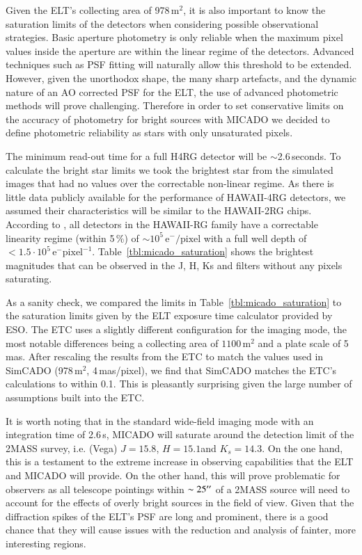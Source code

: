 Given the ELT's collecting area of 978\,m$^2$, it is also important to know the saturation limits of the detectors when considering possible observational strategies. Basic aperture photometry is only reliable when the maximum pixel values inside the aperture are within the linear regime of the detectors. Advanced techniques such as PSF fitting will naturally allow this threshold to be extended. However, given the unorthodox shape, the many sharp artefacts, and the dynamic nature of an AO corrected PSF for the ELT, the use of advanced photometric methods will prove challenging. Therefore in order to set conservative limits on the accuracy of photometry for bright sources with MICADO we decided to define photometric reliability as stars with only unsaturated pixels.

The minimum read-out time for a full H4RG detector will be $\sim$2.6\,seconds.
To calculate the bright star limits we took the brightest star from the simulated images that had no values over the correctable non-linear regime. As there is little data publicly available for the performance of HAWAII-4RG detectors, we assumed their characteristics will be similar to the HAWAII-2RG chips. According to \citet{hawaii2rg}, all detectors in the HAWAII-RG family have a correctable linearity regime (within 5\,\%) of $\sim 10^{5}\,\mathrm{e}^{-}/\mathrm{pixel}$ with a full well depth of $<1.5 \cdot 10^{5}\,\mathrm{e}^{-}\mathrm{pixel}^{-1}$. Table~\ref{tbl:micado_saturation} shows the brightest magnitudes that can be observed in the J, H, Ks and \brgamma filters without any pixels saturating. 

As a sanity check, we compared the limits in Table~\ref{tbl:micado_saturation} to the saturation limits given by the ELT exposure time calculator provided by ESO. The ETC uses a slightly different configuration for the imaging mode, the most notable differences being a collecting area of $1100\,\mathrm{m^2}$ and a plate scale of 5\,mas. After rescaling the results from the ETC to match the values used in SimCADO (978\,m$^2$, 4\,mas/pixel), we find that SimCADO matches the ETC's calculations to within 0.1\m. This is pleasantly surprising given the large number of assumptions built into the ETC.

It is worth noting that in the standard wide-field imaging mode with an integration time of 2.6\,s, MICADO will saturate around the detection limit of the 2MASS survey, i.e. (Vega) $J=15.8$\m, $H=15.1$\m and $K_{s}=14.3$\m \citep{2mass}. On the one hand, this is a testament to the extreme increase in observing capabilities that the ELT and MICADO will provide. On the other hand, this will prove problematic for observers as all telescope pointings within $\sim 25^{\prime\prime}$ of a 2MASS source will need to account for the effects of overly bright sources in the field of view. Given that the diffraction spikes of the ELT's PSF are long and prominent, there is a good chance that they will cause issues with the reduction and analysis of fainter, more interesting regions. 


